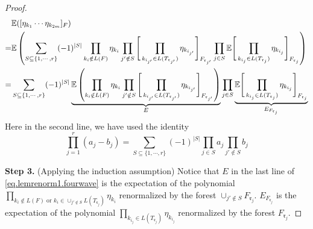 \begin{proof}
 \begingroup
  \allowdisplaybreaks
  \begin{align}\label{eq.lemrenorm1.fourwave}
  &\mathbb{E}([\eta_{k_1}\cdots \eta_{k_{2m}}]_F)\notag
  \\
  =&\mathbb{E}\left(\sum_{S\subseteq\{1,\cdots,r\}}(-1)^{|S|}\prod_{k_i\notin L(F)} \eta_{k_i} \prod_{j'\notin S} \Bigg[\prod_{k_{i_{j'}}\in L(T_{\mathfrak{r}_{j'}})}\eta_{k_{i_{j'}}}\Bigg]_{F_{\mathfrak{r}_{j'}}}
  \prod_{j\in S}\mathbb{E}\Bigg[\prod_{k_{i_{j}}\in L(T_{\mathfrak{r}_j})}\eta_{k_{i_j}}\Bigg]_{F_{\mathfrak{r}_j}}\right)
  \\
  =&\sum_{S\subseteq\{1,\cdots,r\}}(-1)^{|S|}\underbrace{\mathbb{E}\left(\prod_{k_{i}\notin L(F)} \eta_{k_i} \prod_{j'\notin S} \Bigg[\prod_{k_{i_{j'}}\in L(T_{\mathfrak{r}_{j'}})}\eta_{k_{i_{j'}}}\Bigg]_{F_{\mathfrak{r}_{j'}}}\right)}_{E}
  \prod_{j\in S}\underbrace{\mathbb{E}\Bigg[\prod_{k_{i_{j}}\in L(T_{\mathfrak{r}_j})}\eta_{k_{i_j}}\Bigg]_{F_{\mathfrak{r}_j}}}_{E_{F_{\mathfrak{r}_j}}}\notag
  \end{align}
 \endgroup
 Here in the second line, we have used the identity 
 \begin{equation}
  \prod_{j=1}^r (a_j-b_j)=\sum_{S\subseteq\{1,\cdots,r\}}(-1)^{|S|} \prod_{j\in S}a_j\prod_{j'\notin S}b_j
 \end{equation}
 
 
 
 
 \textbf{Step 3.} (Applying the induction assumption) Notice that $E$ in the last line of \eqref{eq.lemrenorm1.fourwave} is the expectation of the polynomial $\prod_{k_i\notin L(F)\text{ or }k_i\in \cup_{j'\notin S}L(T_{\mathfrak{r}_j})}\eta_{k_i}$ renormalized by the forest $\cup_{j'\notin S}F_{\mathfrak{r}_j}$. $E_{F_{\mathfrak{r}_j}}$ is the expectation of the polynomial $\prod_{k_{i_{j}}\in L(T_{\mathfrak{r}_j})}\eta_{k_{i_j}}$ renormalized by the forest $F_{\mathfrak{r}_j}$. 
 

\end{proof}

